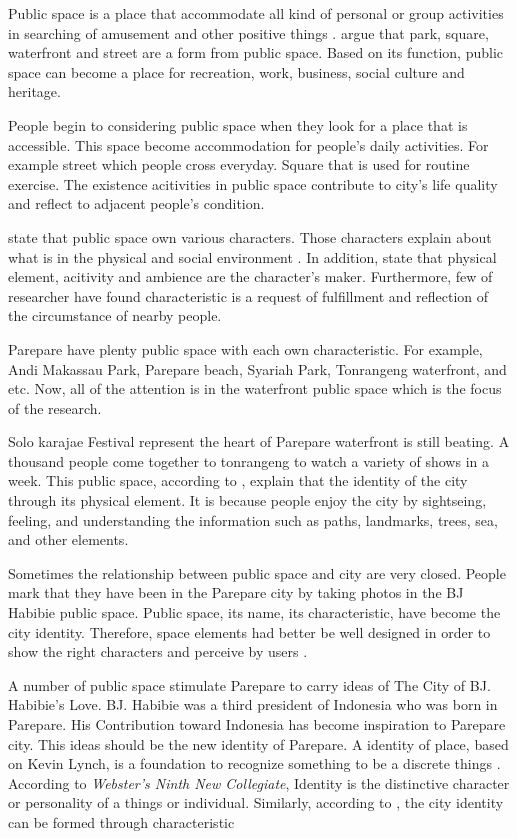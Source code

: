 \documentclass[11pt]{simart} %
\begin{document}
Public space is a place that accommodate all kind of personal or group activities in searching of amusement and other positive things \citep{sadat2012}. \cite{sadat2012} argue that park, square, waterfront and street are a form from public space. Based on its function, public space can become a place for recreation, work, business, social culture and heritage.

People begin to considering public space when they look for a place that is accessible. This space become accommodation for people's daily activities. For example street which people cross everyday. Square that is used for routine exercise. The existence acitivities in public space contribute to city's life quality and reflect to adjacent people's condition.

\cite{ahmadi2009} state that public space own various characters. Those characters explain about what is in the physical and social environment \citep{dougherty2006}. In addition, \cite{hartanti2014} state that physical element, acitivity and ambience are the character's maker. Furthermore, few of researcher have found characteristic is a request of fulfillment and reflection of the circumstance of nearby people.

Parepare have plenty public space with each own characteristic. For example, Andi Makassau Park, Parepare beach, Syariah Park, Tonrangeng waterfront, and etc. Now, all of the attention is in the waterfront public space which is the focus of the research.

Solo karajae Festival represent the heart of Parepare waterfront is still beating. A thousand people come together to tonrangeng to watch a variety of shows in a week. This public space, according to \cite{hartanti2014}, explain that the identity of the city through its physical element. It is because people enjoy the city by sightseing, feeling, and understanding the information such as paths, landmarks, trees, sea, and other elements.

Sometimes the relationship between public space and city are very closed. People mark that they have been in the Parepare city by taking photos in the BJ Habibie public space. Public space, its name, its characteristic, have become the city identity. Therefore, space elements had better be well designed in order to show the right characters and perceive by users \citep{hartanti2014}.

A number of public space stimulate Parepare to carry ideas of The City of BJ. Habibie's Love. BJ. Habibie was a third president of Indonesia who was born in Parepare. His Contribution toward Indonesia has become inspiration to Parepare city. This ideas should be the new identity of Parepare.
A identity of place, based on Kevin Lynch, is a foundation to recognize something to be a discrete things \citep{hartanti2014}. According to \textit{Webster's Ninth New Collegiate}, Identity is the distinctive character or personality of a things or individual. Similarly, according to \cite{hartanti2014}, the city identity can be formed through characteristic
\end{document}
